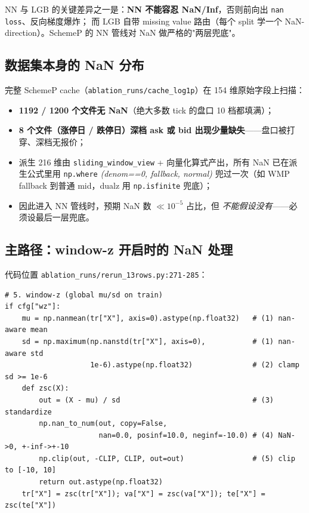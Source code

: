 \documentclass[10.5pt,a4paper]{article}
\begin{document}
NN 与 LGB 的关键差异之一是：\textbf{NN 不能容忍 NaN/Inf}，否则前向出 \texttt{nan loss}、反向梯度爆炸；
而 LGB 自带 missing value 路由（每个 split 学一个 NaN-direction）。SchemeP 的 NN 管线对 NaN 做严格的"两层兜底"。

\subsection{数据集本身的 NaN 分布}

完整 SchemeP cache（\texttt{ablation\_runs/cache\_log1p}）在 154 维原始字段上扫描：
\begin{itemize}[leftmargin=2em,itemsep=1pt,topsep=2pt]
  \item \textbf{1192 / 1200 个文件无 NaN}（绝大多数 tick 的盘口 10 档都填满）；
  \item \textbf{8 个文件（涨停日 / 跌停日）深档 ask 或 bid 出现少量缺失}——盘口被打穿、深档无报价；
  \item 派生 216 维由 \texttt{sliding\_window\_view} + 向量化算式产出，所有 NaN 已在派生公式里用 \texttt{np.where} \emph{(denom==0, fallback, normal)} 兜过一次（如 WMP fallback 到普通 mid，dualz 用 \texttt{np.isfinite} 兜底）；
  \item 因此进入 NN 管线时，预期 NaN 数 $\ll 10^{-5}$ 占比，但 \emph{不能假设没有}——必须设最后一层兜底。
\end{itemize}

\subsection{主路径：window-z 开启时的 NaN 处理}

代码位置 \texttt{ablation\_runs/rerun\_13rows.py:271-285}：

\begin{lstlisting}
# 5. window-z (global mu/sd on train)
if cfg["wz"]:
    mu = np.nanmean(tr["X"], axis=0).astype(np.float32)   # (1) nan-aware mean
    sd = np.maximum(np.nanstd(tr["X"], axis=0),           # (1) nan-aware std
                    1e-6).astype(np.float32)              # (2) clamp sd >= 1e-6
    def zsc(X):
        out = (X - mu) / sd                               # (3) standardize
        np.nan_to_num(out, copy=False,
                      nan=0.0, posinf=10.0, neginf=-10.0) # (4) NaN->0, +-inf->+-10
        np.clip(out, -CLIP, CLIP, out=out)                # (5) clip to [-10, 10]
        return out.astype(np.float32)
    tr["X"] = zsc(tr["X"]); va["X"] = zsc(va["X"]); te["X"] = zsc(te["X"])
\end{lstlisting}
\end{document}
